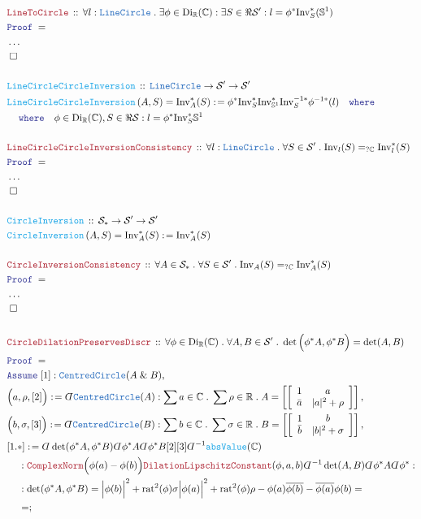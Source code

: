 \documentclass[12pt]{scrartcl}
\newcommand{\TYPE}[1]{\textcolor{NavyBlue}{\mathtt{#1}}}
\newcommand{\FUNC}[1]{\textcolor{Cerulean}{\mathtt{#1}}}
\newcommand{\LOGIC}[1]{\textcolor{Blue}{\mathtt{#1}}}
\newcommand{\THM}[1]{\textcolor{Maroon}{\mathtt{#1}}}
\renewcommand{\.}{\; . \;}
\newcommand{\de}{: \kern 0.1pc =}
\newcommand{\where}{\LOGIC{where}}
\newcommand{\Act}[1]{\left( #1 \right)}
\newcommand{\Theorem}[2]{& \THM{#1} \, :: \, #2 \\ & \Proof = \\ }
\newcommand{\DeclareFunc}[2]{& \FUNC{#1} \, :: \, #2 \\}
\newcommand{\DefineNamedFunc}[4]{&  \FUNC{#1}\Act{#2} = #3 \de #4 \\}
\newcommand{\NewLine}{\\ & \kern 1pc}
\newcommand{\Page}[1]{ \begin{align*} #1 \end{align*}   }
\newcommand{ \bd }{ \ByDef }
\newcommand{\NoProof}{ & \ldots \\ \EndProof}
\renewcommand{\And}{\; \& \;}
\newcommand{\Reals}{\mathbb{R} }
\newcommand{\Complex}{\mathbb{C}}
\newcommand{\Sphere}{\mathbb{S}}
\newcommand{\Say}[3]{& #1 \de #2 : #3, \\}
\newcommand{\Conclude}[3]{& #1 \de #2 : #3; \\}
\newcommand{\Assume}[2]{& \LOGIC{Assume} \; #1 : #2, \\}
\newcommand{\QED}{\; \square}
\newcommand{\EndProof}{& \QED \\}
\newcommand{\ByDef}{\rotatebox[origin=c]{-180}{$D$}}%
\newcommand{\Proof}{\LOGIC{Proof} \; }
\renewcommand{\S}{\mathcal{S}}
\newcommand{\Inv}{\mathrm{Inv}}
\newcommand{\Di}{\mathrm{Di}}
\begin{document}
\Page{
	\Theorem{LineToCircle}
	{
		\forall l : \TYPE{LineCircle} \.
		\exists \phi \in \Di_\Reals(\Complex) :
		\exists S \in \Re \S' :
		l =  \phi^*\Inv_S^*(\Sphere^1)        
	}
	\NoProof
	\\
	\DeclareFunc{LineCircleCircleInversion}
	{
		\TYPE{LineCircle} \to \S'  \to \S'
	}
	\DefineNamedFunc{LineCircleCircleInversion}{A,S}
	{
		\Inv_{A}^*(S) 
	}
	{ 
		\phi^{*} \Inv_S^* \Inv_{\Sphere^1}^*\Inv^{-1*}_S \phi^{-1*}(l) 
		\quad
		\where \NewLine \where
		\quad
		\phi \in \Di_\Reals(\Complex), S \in \Re \S :
		l = \phi^* \Inv^*_S \Sphere^1
	}
	\\
	\Theorem{LineCircleCircleInversionConsistency}
	{  
		\forall l : \TYPE{LineCircle} \.
		\forall S  \in \S' \.
		\Inv_{l}(S) =_{?\Complex}  \Inv_{l}^*(S)
	}
	\NoProof
	\\
	\DeclareFunc{CircleInversion}
	{
		\S_* \to \S'  \to \S'
	}
	\DefineNamedFunc{CircleInversion}{A,S}
	{
		\Inv_{A}^*(S) 
	}
	{ 
		\Inv_{A}^*(S)
	}	
	\\
	\Theorem{CircleInversionConsistency}
	{  
		\forall A \in \S_*  \.
		\forall S  \in \S' \.
		\Inv_{A}(S) =_{?\Complex}  \Inv_{A}^*(S)
	}
	\NoProof
	\\
	\Theorem{CircleDilationPreservesDiscr}
	{
		\forall \phi \in \Di_{\Reals}(\Complex) \. 
		\forall A,B \in \S' \.
		\det\Big(\phi^*A,\phi^*B\Big) = \det(A,B)
	}
	\Assume{[1]}{\TYPE{CentredCircle}(A \And B)}
	\Say{\Big(a,\rho,[2]\Big)}
	{
		\bd \TYPE{CentredCircle}(A)
	}
	{
		\sum a \in \Complex \.
		\sum \rho \in \Reals \.
		A = 
		\left[\left[
		\begin{array}{cc}
			1 & a \\
			\bar a & |a|^2 + \rho
		\end{array}
		\right]\right]
	}
	\Say{\Big(b,\sigma,[3]\Big)}
	{
		\bd \TYPE{CentredCircle}(B)
	}
	{
		\sum b \in \Complex \.
		\sum \sigma \in \Reals \.
		B = 
		\left[\left[
		\begin{array}{cc}
			1 & b \\
			\bar b & |b|^2 + \sigma
		\end{array}
		\right]\right]
	}
	\Conclude{[1.*]}
	{
		\bd \det(\phi^*A,\phi^*B) \bd \phi^* A \bd \phi^* B [2][3]
		\bd^{-1} \FUNC{absValue}(\Complex) 
		\NewLine :
		\THM{ComplexNorm}\Big(\phi(a) - \phi(b)\Big)
		\THM{DilationLipschitzConstant}(\phi,a,b)
		\bd^{-1} \det(A,B) \bd \phi^* A \bd \phi^*
	}
	{
		\NewLine :
		\det(\phi^*A,\phi^*B) =
		\Big|\phi(b)\Big|^2 +  \mathrm{rat}^2(\phi)\sigma	
		\Big|\phi(a)\Big|^2 +  \mathrm{rat}^2(\phi)\rho
		- \phi(a)\overline{\phi(b)} 
		- \overline{\phi(a)}\phi(b) = \NewLine =
}}
\end{document}
